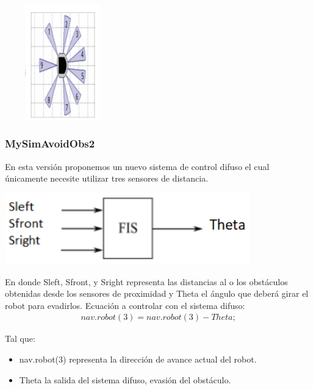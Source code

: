 \begin{center}
    \includegraphics[width=5cm, height=5cm]{Tesis/Capitulos/04_CAPITULO_2/img/robot_multiple_sensors.png}
    \label{fig:MySymAvoidObs1ms}
\end{center}

\subsubsection{MySimAvoidObs2}

En esta versión proponemos un nuevo sistema de control difuso el cual únicamente necesite utilizar tres sensores de distancia.

\begin{center}
    \includegraphics[scale=0.5]{Tesis/Capitulos/04_CAPITULO_2/img/esquema1.png}
\end{center}


\bigbreak
En donde Sleft, Sfront, y Sright representa las distancias al o los obstáculos obtenidas desde los sensores de proximidad y Theta el ángulo que deberá girar el robot para evadirlos.
\bigbreak
Ecuación a controlar con el sistema difuso:
\begin{equation}\boxed{
\begin{array}{rcl}
nav.robot(3) = nav.robot(3) - Theta;
\end{array}}
\end{equation}

Tal que:
\begin{itemize}
    \item nav.robot(3) representa la dirección de avance actual del robot.
    \item Theta la salida del sistema difuso, evasión del obstáculo.
\end{itemize}


